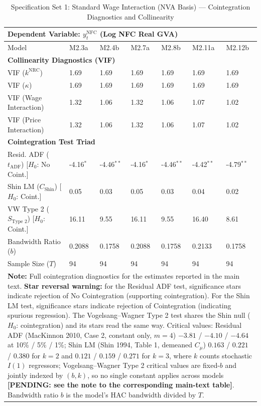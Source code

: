 \begin{table}[H]
\centering
\setlength{\tabcolsep}{2.5pt}
\caption{Specification Set 1: Standard Wage Interaction (NVA Basis) --- Cointegration Diagnostics and Collinearity}
\label{tab:specB_set1_nva_triad}
\scriptsize
\begin{tabular}{p{3.8cm}p{1.1cm}p{1.1cm}p{1.1cm}p{1.1cm}p{1.1cm}p{1.1cm}}
\toprule
\multicolumn{7}{l}{\textbf{Dependent Variable: $y_t^{\text{NFC}}$ (Log NFC Real GVA)}} \\
\midrule
Model & M2.3a & M2.4b & M2.7a & M2.8b & M2.11a & M2.12b \\
\midrule
\multicolumn{7}{l}{\textbf{Collinearity Diagnostics (VIF)}} \\
VIF ($k^{\text{NRC}}$) & 1.69 & 1.69 & 1.69 & 1.69 & 1.69 & 1.69 \\
VIF ($\kappa$) & 1.69 & 1.69 & 1.69 & 1.69 & 1.69 & 1.69 \\
VIF (Wage Interaction) & 1.32 & 1.06 & 1.32 & 1.06 & 1.07 & 1.02 \\
VIF (Price Interaction) & 1.32 & 1.06 & 1.32 & 1.06 & 1.07 & 1.02 \\
\midrule
\multicolumn{7}{l}{\textbf{Cointegration Test Triad}} \\
Resid. ADF ($t_{\text{ADF}}$) [$H_0$: No Coint.] & -4.16$^{*}$ & -4.46$^{**}$ & -4.16$^{*}$ & -4.46$^{**}$ & -4.42$^{**}$ & -4.79$^{**}$ \\
Shin LM ($C_{\text{Shin}}$) [$H_0$: Coint.] & 0.05 & 0.03 & 0.05 & 0.03 & 0.04 & 0.02 \\
VW Type 2 ($S_{\text{Type 2}}$) [$H_0$: Coint.] & 16.11 & 9.55 & 16.11 & 9.55 & 16.40 & 8.61 \\
\midrule
Bandwidth Ratio ($b$) & 0.2088 & 0.1758 & 0.2088 & 0.1758 & 0.2133 & 0.1758 \\
Sample Size ($T$) & 94 & 94 & 94 & 94 & 94 & 94 \\
\bottomrule
\multicolumn{7}{p{15cm}}{\footnotesize \textbf{Note:} Full cointegration diagnostics for the estimates reported in the main text. \textbf{Star reversal warning:} for the Residual ADF test, significance stars indicate rejection of No Cointegration (supporting cointegration). For the Shin LM test, significance stars indicate rejection of Cointegration (indicating spurious regression). The Vogelsang--Wagner Type 2 test shares the Shin null ($H_0$: cointegration) and its stars read the same way. Critical values: Residual ADF (MacKinnon 2010, Case 2, constant only, $m=4$) $-3.81$ / $-4.10$ / $-4.64$ at 10\% / 5\% / 1\%; Shin LM (Shin 1994, Table 1, demeaned $C_\mu$) $0.163$ / $0.221$ / $0.380$ for $k=2$ and $0.121$ / $0.159$ / $0.271$ for $k=3$, where $k$ counts stochastic $I(1)$ regressors; Vogelsang--Wagner Type 2 critical values are fixed-$b$ and jointly indexed by $(b, k)$, so no single constant applies across models \textbf{[PENDING: see the note to the corresponding main-text table]}. Bandwidth ratio $b$ is the model's HAC bandwidth divided by $T$.} \\
\end{tabular}
\end{table}
